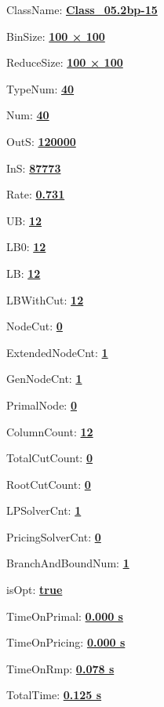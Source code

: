 \documentclass[11pt]{article}
\begin{document}
\pagestyle{empty}


ClassName: \underline{\textbf{Class_05.2bp-15}}
\par
BinSize: \underline{\textbf{100 × 100}}
\par
ReduceSize: \underline{\textbf{100 × 100}}
\par
TypeNum: \underline{\textbf{40}}
\par
Num: \underline{\textbf{40}}
\par
OutS: \underline{\textbf{120000}}
\par
InS: \underline{\textbf{87773}}
\par
Rate: \underline{\textbf{0.731}}
\par
UB: \underline{\textbf{12}}
\par
LB0: \underline{\textbf{12}}
\par
LB: \underline{\textbf{12}}
\par
LBWithCut: \underline{\textbf{12}}
\par
NodeCut: \underline{\textbf{0}}
\par
ExtendedNodeCnt: \underline{\textbf{1}}
\par
GenNodeCnt: \underline{\textbf{1}}
\par
PrimalNode: \underline{\textbf{0}}
\par
ColumnCount: \underline{\textbf{12}}
\par
TotalCutCount: \underline{\textbf{0}}
\par
RootCutCount: \underline{\textbf{0}}
\par
LPSolverCnt: \underline{\textbf{1}}
\par
PricingSolverCnt: \underline{\textbf{0}}
\par
BranchAndBoundNum: \underline{\textbf{1}}
\par
isOpt: \underline{\textbf{true}}
\par
TimeOnPrimal: \underline{\textbf{0.000 s}}
\par
TimeOnPricing: \underline{\textbf{0.000 s}}
\par
TimeOnRmp: \underline{\textbf{0.078 s}}
\par
TotalTime: \underline{\textbf{0.125 s}}
\par
\newpage


\end{document}
